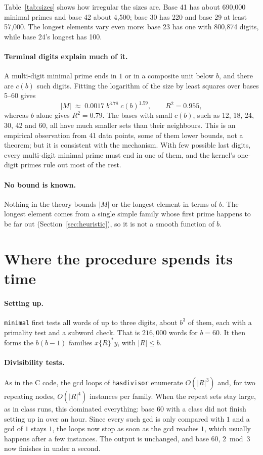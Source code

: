 \documentclass[11pt]{article}
\theoremstyle{remark}
\newcommand{\code}[1]{\texttt{#1}}
\begin{document}
Table~\ref{tab:sizes} shows how irregular the sizes are. Base 41 has about 690{,}000 minimal primes and base 42 about 4{,}500; base 30 has 220 and base 29 at least 57{,}000. The longest elements vary even more: base 23 has one with 800{,}874 digits, while base 24's longest has 100.

\paragraph{Terminal digits explain much of it.} A multi-digit minimal prime ends in $1$ or in a composite unit below $b$, and there are $c(b)$ such digits. Fitting the logarithm of the size by least squares over bases 5--60 gives
\[
  |M|\;\approx\;0.0017\; b^{3.78}\; c(b)^{1.59},\qquad R^2=0.955,
\]
whereas $b$ alone gives $R^2=0.79$. The bases with small $c(b)$, such as 12, 18, 24, 30, 42 and 60, all have much smaller sets than their neighbours. This is an empirical observation from 41 data points, some of them lower bounds, not a theorem; but it is consistent with the mechanism. With few possible last digits, every multi-digit minimal prime must end in one of them, and the kernel's one-digit primes rule out most of the rest.

\paragraph{No bound is known.} Nothing in the theory bounds $|M|$ or the longest element in terms of $b$. The longest element comes from a single simple family whose first prime happens to be far out (Section~\ref{sec:heuristic}), so it is not a smooth function of $b$.

\section{Where the procedure spends its time}

\paragraph{Setting up.} \code{minimal} first tests all words of up to three digits, about $b^3$ of them, each with a primality test and a subword check. That is $216{,}000$ words for $b=60$. It then forms the $b(b-1)$ families $x\{R\}^*y$, with $|R|\le b$.

\paragraph{Divisibility tests.} As in the C code, the gcd loops of \code{hasdivisor} enumerate $O(|R|^3)$ and, for two repeating nodes, $O(|R|^4)$ instances per family. When the repeat sets stay large, as in class runs, this dominated everything: base 60 with a class did not finish setting up in over an hour. Since every such gcd is only compared with $1$ and a gcd of $1$ stays $1$, the loops now stop as soon as the gcd reaches $1$, which usually happens after a few instances. The output is unchanged, and base 60, $2 \bmod 3$ now finishes in under a second.
\end{document}
